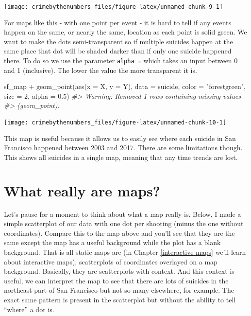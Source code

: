 \documentclass[
]{krantz}
\makeatletter
\newenvironment{Shaded}{\begin{snugshade}}{\end{snugshade}}
\newcommand{\AttributeTok}[1]{\textcolor[rgb]{0.61,0.61,0.61}{#1}}
\newcommand{\CommentTok}[1]{\textcolor[rgb]{0.37,0.37,0.37}{\textit{#1}}}
\newcommand{\DecValTok}[1]{\textcolor[rgb]{0.06,0.06,0.06}{#1}}
\newcommand{\FloatTok}[1]{\textcolor[rgb]{0.06,0.06,0.06}{#1}}
\newcommand{\FunctionTok}[1]{\textcolor[rgb]{0,0,0}{#1}}
\newcommand{\NormalTok}[1]{#1}
\newcommand{\SpecialCharTok}[1]{\textcolor[rgb]{0,0,0}{#1}}
\newcommand{\StringTok}[1]{\textcolor[rgb]{0.5,0.5,0.5}{#1}}
\newenvironment{kframe}{%
\medskip{}
\setlength{\fboxsep}{.8em}
 \def\at@end@of@kframe{}%
 \ifinner\ifhmode%
  \def\at@end@of@kframe{\end{minipage}}%
  \begin{minipage}{\columnwidth}%
 \fi\fi%
 \def\FrameCommand##1{\hskip\@totalleftmargin \hskip-\fboxsep
 \colorbox{shadecolor}{##1}\hskip-\fboxsep
     \hskip-\linewidth \hskip-\@totalleftmargin \hskip\columnwidth}%
 \MakeFramed {\advance\hsize-\width
   \@totalleftmargin\z@ \linewidth\hsize
   \@setminipage}}%
 {\par\unskip\endMakeFramed%
 \at@end@of@kframe}
\renewenvironment{Shaded}{\begin{kframe}}{\end{kframe}}
\makeatother
\begin{document}
\begin{center}\texttt{[image: crimebythenumbers\_files/figure-latex/unnamed-chunk-9-1]} \end{center}

For maps like this - with one point per event - it is hard to tell if any events happen on the same, or nearly the same, location as each point is solid green. We want to make the dots semi-transparent so if multiple suicides happen at the same place that dot will be shaded darker than if only one suicide happened there. To do so we use the parameter \texttt{alpha\ =} which takes an input between 0 and 1 (inclusive). The lower the value the more transparent it is.

\begin{Shaded}
\begin{Highlighting}[]
\NormalTok{sf\_map }\SpecialCharTok{+}
  \FunctionTok{geom\_point}\NormalTok{(}\FunctionTok{aes}\NormalTok{(}\AttributeTok{x =}\NormalTok{ X, }\AttributeTok{y =}\NormalTok{ Y),}
             \AttributeTok{data  =}\NormalTok{ suicide,}
             \AttributeTok{color =} \StringTok{"forestgreen"}\NormalTok{,}
             \AttributeTok{size  =} \DecValTok{2}\NormalTok{,}
             \AttributeTok{alpha =} \FloatTok{0.5}\NormalTok{)}
\CommentTok{\#\textgreater{} Warning: Removed 1 rows containing missing values}
\CommentTok{\#\textgreater{} (geom\_point).}
\end{Highlighting}
\end{Shaded}

\begin{center}\texttt{[image: crimebythenumbers\_files/figure-latex/unnamed-chunk-10-1]} \end{center}

This map is useful because it allows us to easily see where each suicide in San Francisco happened between 2003 and 2017. There are some limitations though. This shows all suicides in a single map, meaning that any time trends are lost.

\hypertarget{what-really-are-maps}{%
\section{What really are maps?}\label{what-really-are-maps}}

Let's pause for a moment to think about what a map really is. Below, I made a simple scatterplot of our data with one dot per shooting (minus the one without coordinates). Compare this to the map above and you'll see that they are the same except the map has a useful background while the plot has a blank background. That is all static maps are (in Chapter \ref{interactive-maps} we'll learn about interactive maps), scatterplots of coordinates overlayed on a map background. Basically, they are scatterplots with context. And this context is useful, we can interpret the map to see that there are lots of suicides in the northeast part of San Francisco but not so many elsewhere, for example. The exact same pattern is present in the scatterplot but without the ability to tell ``where'' a dot is.
\end{document}
